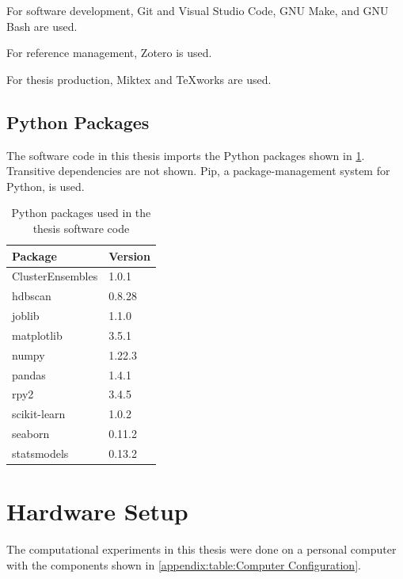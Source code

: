 \begin{theappendices}
For software development, Git and Visual Studio Code, GNU Make, and GNU Bash are used.

For reference management, Zotero is used.

For thesis production, Miktex and TeXworks are used.

\FloatBarrier
\subsection{Python Packages}

The software code in this thesis imports the Python packages shown in \cref{appendix:table:Python Packages}. Transitive dependencies are not shown. Pip, a package-management system for Python, is used.

\begin{table}[htbp]
\centering
\begin{tabular}{ll}
\toprule
         Package & Version \\
\midrule
ClusterEnsembles &   1.0.1 \\
         hdbscan &  0.8.28 \\
          joblib &   1.1.0 \\
      matplotlib &   3.5.1 \\
           numpy &  1.22.3 \\
          pandas &   1.4.1 \\
            rpy2 &   3.4.5 \\
    scikit-learn &   1.0.2 \\
         seaborn &  0.11.2 \\
     statsmodels &  0.13.2 \\
\bottomrule
\end{tabular}
\caption{Python packages used in the thesis software code}
\label{appendix:table:Python Packages}
\end{table}

\section{Hardware Setup}

The computational experiments in this thesis were done on a personal computer with the components shown in \cref{appendix:table:Computer Configuration}.


\end{theappendices}

